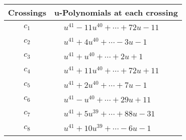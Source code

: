 \documentclass[1p]{elsarticle_modified}
\theoremstyle{definition}
\begin{document}
\begin{tabular}{m{50pt}|m{274pt}}
Crossings & \hspace{64pt}u-Polynomials at each crossing \\
\hline $$\begin{aligned}c_{1}\end{aligned}$$&$\begin{aligned}
&u^{41}-11 u^{40}+\cdots+72 u-11
\end{aligned}$\\
\hline $$\begin{aligned}c_{2}\end{aligned}$$&$\begin{aligned}
&u^{41}+4 u^{40}+\cdots-3 u-1
\end{aligned}$\\
\hline $$\begin{aligned}c_{3}\end{aligned}$$&$\begin{aligned}
&u^{41}+u^{40}+\cdots+2 u+1
\end{aligned}$\\
\hline $$\begin{aligned}c_{4}\end{aligned}$$&$\begin{aligned}
&u^{41}+11 u^{40}+\cdots+72 u+11
\end{aligned}$\\
\hline $$\begin{aligned}c_{5}\end{aligned}$$&$\begin{aligned}
&u^{41}+2 u^{40}+\cdots+7 u-1
\end{aligned}$\\
\hline $$\begin{aligned}c_{6}\end{aligned}$$&$\begin{aligned}
&u^{41}- u^{40}+\cdots+29 u+11
\end{aligned}$\\
\hline $$\begin{aligned}c_{7}\end{aligned}$$&$\begin{aligned}
&u^{41}+5 u^{39}+\cdots+88 u-31
\end{aligned}$\\
\hline $$\begin{aligned}c_{8}\end{aligned}$$&$\begin{aligned}
&u^{41}+10 u^{39}+\cdots-6 u-1
\end{aligned}$\\

\end{tabular}
\end{document}
